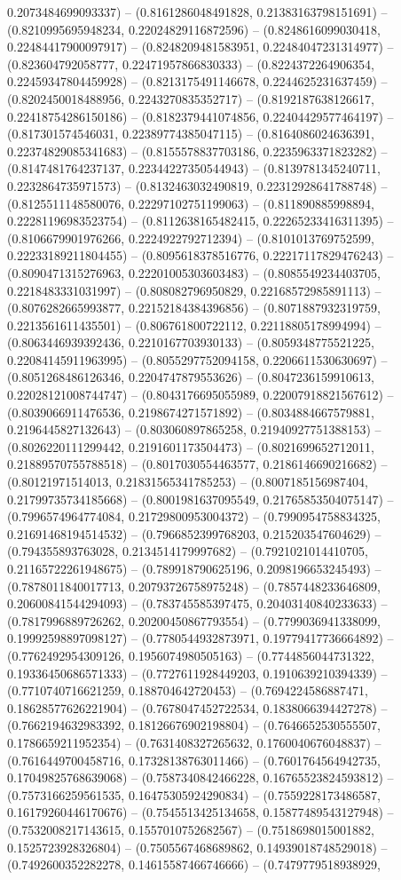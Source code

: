 0.2073484699093337) -- (0.8161286048491828, 0.21383163798151691) -- (0.8210995695948234, 0.22024829116872596) -- (0.8248616099030418, 0.22484417900097917) -- (0.8248209481583951, 0.22484047231314977) -- (0.823604792058777, 0.22471957866830333) -- (0.8224372264906354, 0.22459347804459928) -- (0.8213175491146678, 0.2244625231637459) -- (0.8202450018488956, 0.2243270835352717) -- (0.8192187638126617, 0.22418754286150186) -- (0.8182379441074856, 0.22404429577464197) -- (0.817301574546031, 0.22389774385047115) -- (0.8164086024636391, 0.22374829085341683) -- (0.8155578837703186, 0.2235963371823282) -- (0.8147481764237137, 0.22344227350544943) -- (0.8139781345240711, 0.2232864735971573) -- (0.8132463032490819, 0.22312928641788748) -- (0.8125511148580076, 0.22297102751199063) -- (0.811890885998894, 0.22281196983523754) -- (0.8112638165482415, 0.22265233416311395) -- (0.8106679901976266, 0.2224922792712394) -- (0.8101013769752599, 0.22233189211804455) -- (0.8095618378516776, 0.22217117829476243) -- (0.8090471315276963, 0.22201005303603483) -- (0.8085549234403705, 0.2218483331031997) -- (0.808082796950829, 0.22168572985891113) -- (0.8076282665993877, 0.22152184384396856) -- (0.8071887932319759, 0.2213561611435501) -- (0.806761800722112, 0.22118805178994994) -- (0.8063446939392436, 0.2210167703930133) -- (0.8059348775521225, 0.22084145911963995) -- (0.8055297752094158, 0.2206611530630697) -- (0.8051268486126346, 0.2204747879553626) -- (0.8047236159910613, 0.22028121008744747) -- (0.8043176695055989, 0.22007918821567612) -- (0.8039066911476536, 0.2198674271571892) -- (0.8034884667579881, 0.2196445827132643) -- (0.803060897865258, 0.21940927751388153) -- (0.8026220111299442, 0.2191601173504473) -- (0.8021699652712011, 0.21889570755788518) -- (0.8017030554463577, 0.2186146690216682) -- (0.80121971514013, 0.21831565341785253) -- (0.8007185156987404, 0.21799735734185668) -- (0.8001981637095549, 0.21765853504075147) -- (0.7996574964774084, 0.21729800953004372) -- (0.7990954758834325, 0.21691468194514532) -- (0.7966852399768203, 0.215203547604629) -- (0.794355893763028, 0.2134514179997682) -- (0.7921021014410705, 0.21165722261948675) -- (0.789918790625196, 0.2098196653245493) -- (0.7878011840017713, 0.20793726758975248) -- (0.7857448233646809, 0.20600841544294093) -- (0.783745585397475, 0.20403140840233633) -- (0.7817996889726262, 0.20200450867793554) -- (0.7799036941338099, 0.19992598897098127) -- (0.7780544932873971, 0.19779417736664892) -- (0.7762492954309126, 0.1956074980505163) -- (0.7744856044731322, 0.19336450686571333) -- (0.7727611928449203, 0.1910639210394339) -- (0.7710740716621259, 0.188704642720453) -- (0.7694224586887471, 0.18628577626221904) -- (0.7678047452722534, 0.1838066394427278) -- (0.7662194632983392, 0.18126676902198804) -- (0.7646652530555507, 0.1786659211952354) -- (0.7631408327265632, 0.1760040676048837) -- (0.7616449700458716, 0.17328138763011466) -- (0.7601764564942735, 0.17049825768639068) -- (0.7587340842466228, 0.16765523824593812) -- (0.7573166259561535, 0.16475305924290834) -- (0.7559228173486587, 0.16179260446170676) -- (0.7545513425134658, 0.15877489543127948) -- (0.7532008217143615, 0.1557010752682567) -- (0.7518698015001882, 0.1525723928326804) -- (0.7505567468689862, 0.14939018748529018) -- (0.7492600352282278, 0.14615587466746666) -- (0.7479779518938929, 